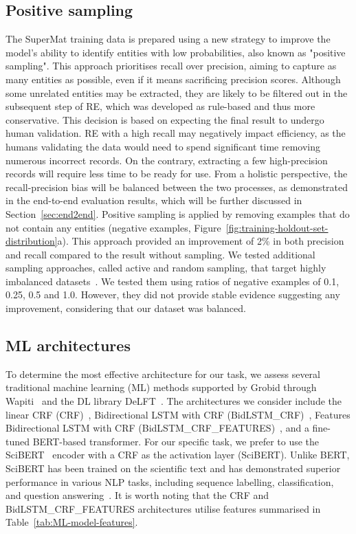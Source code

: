 \subsection{Positive sampling}
The SuperMat training data is prepared using a new strategy to improve the model's ability to identify entities with low probabilities, also known as "positive sampling". 
This approach prioritises recall over precision, aiming to capture as many entities as possible, even if it means sacrificing precision scores. 
Although some unrelated entities may be extracted, they are likely to be filtered out in the subsequent step of RE, which was developed as rule-based and thus more conservative. 
This decision is based on expecting the final result to undergo human validation. RE with a high recall may negatively impact efficiency, as the humans validating the data would need to spend significant time removing numerous incorrect records. On the contrary, extracting a few high-precision records will require less time to be ready for use.
From a holistic perspective, the recall-precision bias will be balanced between the two processes, as demonstrated in the end-to-end evaluation results, which will be further discussed in Section~\ref{sec:end2end}.
Positive sampling is applied by removing examples that do not contain any entities (negative examples, Figure~\ref{fig:training-holdout-set-distribution}a).
This approach provided an improvement of 2\% in both precision and recall compared to the result without sampling.
We tested additional sampling approaches, called active and random sampling, that target highly imbalanced datasets~\cite{lopez2021mining}. 
We tested them using ratios of negative examples of 0.1, 0.25, 0.5 and 1.0. However, they did not provide stable evidence suggesting any improvement, considering that our dataset was balanced. 

\subsection{ML architectures}
\label{sec:ml-architectures}
To determine the most effective architecture for our task, we assess several traditional machine learning (ML) methods supported by Grobid through Wapiti~\cite{lavergne2010practical} and the DL library DeLFT~\cite{delft}.
The architectures we consider include the linear CRF (CRF)~\cite{lafferty2001conditional}, Bidirectional LSTM with CRF (BidLSTM\_CRF)~\cite{lample2016neural}, Features Bidirectional LSTM with CRF (BidLSTM\_CRF\_FEATURES)~\cite{lample2016neural}, and a fine-tuned BERT-based transformer. For our specific task, we prefer to use the SciBERT~\cite{Beltagy2019SciBERT} encoder with a CRF as the activation layer (SciBERT). Unlike BERT, SciBERT has been trained on the scientific text and has demonstrated superior performance in various NLP tasks, including sequence labelling, classification, and question answering~\cite{Beltagy2019SciBERT}. It is worth noting that the CRF and BidLSTM\_CRF\_FEATURES architectures utilise features summarised in Table~\ref{tab:ML-model-features}.


